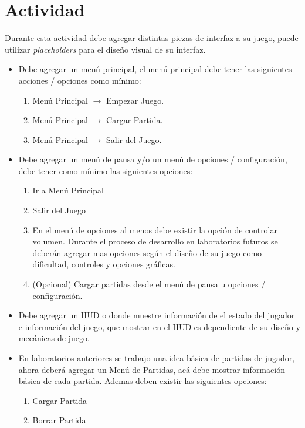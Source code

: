 \section{Actividad}
Durante esta actividad debe agregar distintas piezas de interfaz a su juego, puede utilizar \emph{placeholders} para el diseño visual de su interfaz.
\begin{itemize}
\item Debe agregar un menú principal, el menú principal debe tener las siguientes acciones / opciones como mínimo:
\begin{enumerate}
\item Menú Principal $\rightarrow$ Empezar Juego.
\item Menú Principal $\rightarrow$ Cargar Partida.
\item Menú Principal $\rightarrow$ Salir del Juego.
\end{enumerate}
\item Debe agregar un menú de pausa y/o un menú de opciones / configuración, debe tener como mínimo las siguientes opciones:
\begin{enumerate}
\item Ir a Menú Principal
\item Salir del Juego
\item En el menú de opciones al menos debe existir la opción de controlar volumen. Durante el proceso de desarrollo en laboratorios futuros se deberán agregar mas opciones según el diseño de su juego como dificultad, controles y opciones gráficas.
\item (Opcional) Cargar partidas desde el menú de pausa u opciones / configuración.
\end{enumerate}
\item Debe agregar un HUD o donde muestre información de el estado del jugador e información del juego, que mostrar en el HUD es dependiente de su diseño y mecánicas de juego.
\item En laboratorios anteriores se trabajo una idea básica de partidas de jugador, ahora deberá agregar un Menú de Partidas, acá debe mostrar información básica de cada partida. Ademas deben existir las siguientes opciones:
\begin{enumerate}
\item Cargar Partida
\item Borrar Partida
\end{enumerate}
\end{itemize}